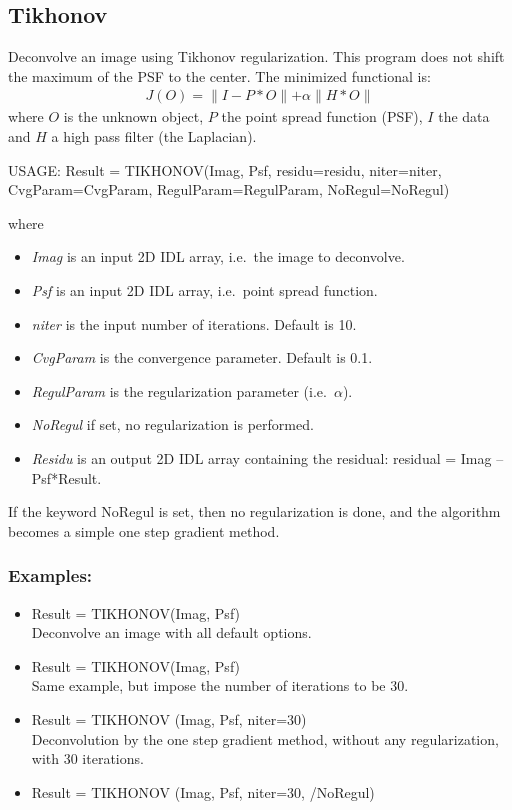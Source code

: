 \subsection{Tikhonov}
 Deconvolve  an image using Tikhonov regularization.
 This program does not shift the maximum of the PSF to the center. 
 The minimized functional is:
\begin{eqnarray}
  J(O) = \parallel I - P*O  \parallel + \alpha  \parallel H*O  \parallel
 \end{eqnarray}
where $O$ is the unknown object, $P$ the point spread function (PSF), $I$
the data and $H$ a high pass filter (the Laplacian).
{\bf
\begin{center}
  USAGE: Result = TIKHONOV(Imag, Psf, residu=residu, niter=niter, 
                         CvgParam=CvgParam, RegulParam=RegulParam, 
                         NoRegul=NoRegul)
 \end{center}}
 where
\begin{itemize}
\item {\em Imag} is an input 2D IDL  array, i.e.\ the image to deconvolve.
\item {\em Psf}  is an input 2D IDL  array, i.e.\ point spread function.
\item {\em niter} is the input number of iterations. Default is 10.
\item {\em CvgParam} is the convergence parameter. Default is 0.1.
\item {\em RegulParam} is the regularization parameter (i.e.\ $\alpha$).
\item {\em NoRegul} if set, no regularization is performed.
\item {\em Residu} is an output 2D IDL array containing the residual: 
residual = Imag -- Psf*Result.
\end{itemize}
 
If the keyword NoRegul is set, then no regularization is done, 
and the algorithm becomes a simple one step gradient method.
\subsubsection*{Examples:}
\begin{itemize}
\item Result = TIKHONOV(Imag, Psf) \\
Deconvolve an image with all default options.
\item  Result = TIKHONOV(Imag, Psf) \\
 Same example, but impose the number of iterations to be 30.
\item   Result = TIKHONOV (Imag, Psf, niter=30) \\
 Deconvolution by the one step gradient method, without 
 any regularization, with 30 iterations.
\item  Result = TIKHONOV (Imag, Psf, niter=30, /NoRegul)  
\end{itemize}
  
